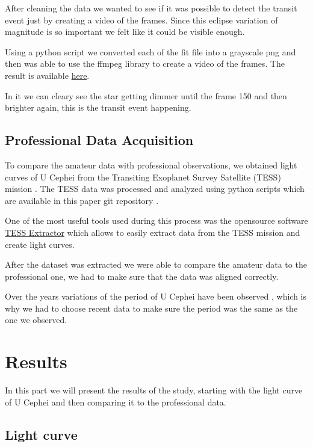 \documentclass[12pt,a4paper]{article}
\begin{document}
After cleaning the data we wanted to see if it was possible to detect the transit event just by creating a video of the frames.
Since this eclipse variation of magnitude is so important we felt like it could be visible enough.

\bigskip

Using a python script we converted each of the fit file into a grayscale png and then was able to use the ffmpeg library to create a video of the frames.
The result is available \href{https://youtube.com/shorts/rVnEccCb3Aw}{here}.

In it we can cleary see the star getting dimmer until the frame 150 and then brighter again, this is the transit event happening.

\subsection{Professional Data Acquisition}

To compare the amateur data with professional observations, we obtained light curves of U Cephei from the Transiting Exoplanet Survey Satellite (TESS) mission \cite{TESS}.
The TESS data was processed and analyzed using python scripts which are available in this paper git repository \cite{GitRepository}.

One of the most useful tools used during this process was the opensource software \href{https://www.tessextractor.app/}{TESS Extractor} \cite{TessExtractor} which allows to easily extract data from the TESS mission and create light curves.

After the dataset was extracted we were able to compare the amateur data to the professional one, we had to make sure that the data was aligned correctly.

Over the years variations of the period of U Cephei have been observed \cite{CEPU} \cite{PeriodChanges}, which is why we had to choose recent data to make sure the period was the same as the one we observed.

\section{Results}

In this part we will present the results of the study, starting with the light curve of U Cephei and then comparing it to the professional data.

\subsection{Light curve}
\end{document}
